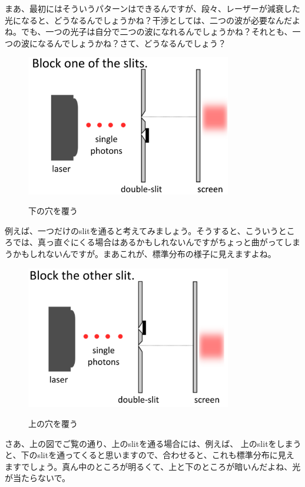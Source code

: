 まあ、最初にはそういうパターンはできるんですが、段々、レーザーが減衰した光になると、どうなるんでしょうかね？干渉としては、二つの波が必要なんだよね。でも、一つの光子は自分で二つの波になれるんでしょうかね？それとも、一つの波になるんでしょうかね？さて、どうなるんでしょう？
\begin{figure}[H]
   \centering
    \includegraphics[width=0.8\textwidth]{lesson6/block_bottom.pdf}
    \label{fig: 1}
    \begin{center}
        \caption{下の穴を覆う}
    \end{center}
\end{figure}

例えば、一つだけのslitを通ると考えてみましょう。そうすると、こういうところでは、真っ直ぐにくる場合はあるかもしれないんですがちょっと曲がってしまうかもしれないんですが。まあこれが、標準分布の様子に見えますよね。
\begin{figure}[H]
   \centering
    \includegraphics[width=0.8\textwidth]{lesson6/block_top.pdf}
    \label{fig: 1}
    \begin{center}
        \caption{上の穴を覆う}
    \end{center}
\end{figure}
さあ、上の図でご覧の通り、上のslitを通る場合には、例えば、
上のslitをしまうと、下のslitを通ってくると思いますので、合わせると、これも標準分布に見えますでしょう。真ん中のところが明るくて、上と下のところが暗いんだよね、光が当たらないで。

